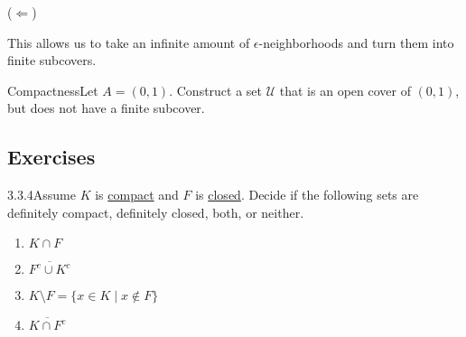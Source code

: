 {\begin{customframedproof}[linecolor=xgray]
\begin{proofpart}[xgray]{(\(\Leftarrow\))}
            \end{proofpart}
    \vspace{2mm}
    \end{customframedproof}
}


\begin{note}
    This allows us to take an infinite amount of \(\epsilon\)-neighborhoods and turn them into finite subcovers.
\end{note}
\begin{example}
    {Compactness}Let \(A = (0,1)\). Construct a set \(\mathcal{U}\) that is an open cover of \((0,1)\), but does not have a finite subcover.
\end{example}


\renewcommand{\theenumi}{\alph{enumi}}
\renewcommand{\labelenumi}{(\theenumi)}
\subsection{Exercises}

\begin{exercise}
    {3.3.4}Assume \(K\) is \hyperref[def:3.3.1]{compact} and \(F\) is \hyperref[def:3.2.5]{closed}. Decide if the following sets are definitely compact, definitely closed, both, or neither. 
    \begin{enumerate}
        \item \(K \cap F\)
        \item \(\overline{F^c \cup K^c}\)
        \item \(K \setminus F = \{x \in K \mid x \notin F\}\)
        \item \(\overline{K \cap F^c}\)
    \end{enumerate}
\end{exercise}

